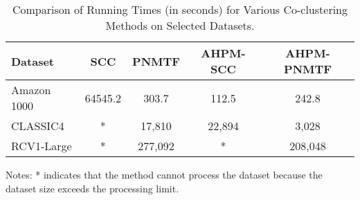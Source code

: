 \begin{table*}[!htbp]
    \centering
    \caption{Comparison of Running Times (in seconds) for Various Co-clustering Methods on Selected Datasets.}
    \label{tab:running-time}
    \begin{tabular}{@{} l cccc @{}}
        \toprule
        Dataset     & SCC \cite{dhillon2001CoclusteringDocumentsWords} & PNMTF \cite{chen2023ParallelNonNegativeMatrix} & \textbf{AHPM-SCC} & \textbf{AHPM-PNMTF} \\
        \midrule
        Amazon 1000 & 64545.2                                          & 303.7                                          & 112.5             & 242.8               \\
        CLASSIC4    & *                                                & 17,810                                         & 22,894            & 3,028               \\
        RCV1-Large  & *                                                & 277,092                                        & *                 & 208,048             \\
        \bottomrule
    \end{tabular}
    \begin{tablenotes}
        \small
        \item Notes: * indicates that the method cannot process the dataset because the dataset size exceeds the processing limit.
    \end{tablenotes}
\end{table*}

